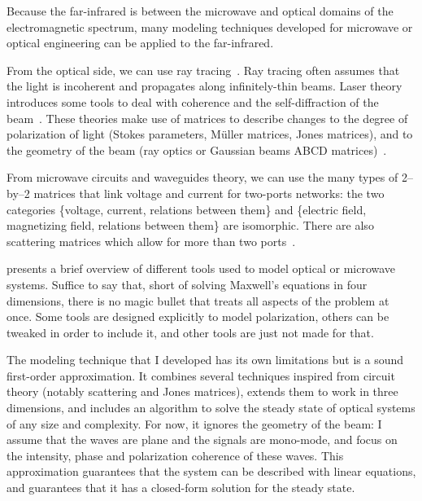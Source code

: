 Because the far-infrared is between the microwave and optical domains of the electromagnetic spectrum, many modeling techniques developed for microwave or optical engineering can be applied to the far-infrared.

From the optical side, we can use ray tracing~\parencite{spencer1962general}.
Ray tracing often assumes that the light is incoherent and propagates along infinitely-thin beams.
Laser theory introduces some tools to deal with coherence and the self-diffraction of the beam~\parencite{siegman1986lasers}.
These theories make use of matrices to describe changes to the degree of polarization of light (Stokes parameters, Müller matrices, Jones matrices), and to the geometry of the beam (ray optics or Gaussian beams ABCD matrices)~\parencite{goldsmith1998quasioptical}.

From microwave circuits and waveguides theory, we can use the many types of 2--by--2 matrices that link voltage and current for two-ports networks:
the two categories \{voltage, current, relations between them\} and \{electric field, magnetizing field, relations between them\} are isomorphic.
There are also scattering matrices which allow for more than two ports~\parencite{pozar2009microwave}.

 presents a brief overview of different tools used to model optical or microwave systems.
Suffice to say that, short of solving Maxwell's equations in four dimensions, there is no magic bullet that treats all aspects of the problem at once.
Some tools are designed explicitly to model polarization, others can be tweaked in order to include it, and other tools are just not made for that.

The modeling technique that I developed has its own limitations but is a sound first-order approximation.
It combines several techniques inspired from circuit theory (notably scattering and Jones matrices), extends them to work in three dimensions, and includes an algorithm to solve the steady state of optical systems of any size and complexity.
For now, it ignores the geometry of the beam: I assume that the waves are plane and the signals are mono-mode, and focus on the intensity, phase and polarization coherence of these waves.
This approximation guarantees that the system can be described with linear equations, and guarantees that it has a closed-form solution for the steady state.


